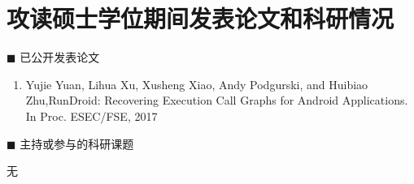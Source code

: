 \section*{攻读硕士学位期间发表论文和科研情况}

\vskip 5mm

{\heiti $\blacksquare$ 已公开发表论文}\vskip 5mm

\begin{enumerate}

  \item Yujie Yuan, Lihua Xu, Xusheng Xiao, Andy Podgurski, and Huibiao Zhu,RunDroid: Recovering Execution Call Graphs for Android Applications. In Proc. ESEC/FSE, 2017
\end{enumerate}


\bigskip\bigskip\bigskip


{\heiti $\blacksquare$ 主持或参与的科研课题}\vskip 5mm

无



